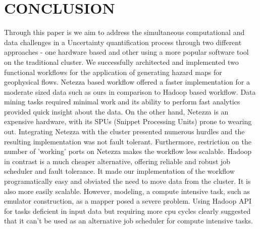 \documentclass{acm_proc_article-sp}
\begin{document}
\section{CONCLUSION}
Through this paper is we aim to address the simultaneous computational and data challenges in a Uncertainty quantification process
through two different approaches - one hardware based and other using a more popular software tool on the traditional cluster.
We successfully architected and implemented two functional workflows for the application of generating hazard maps for geophysical flows.
Netezza based workflow offered a faster implementation for a moderate sized data such as ours in comparison to Hadoop based workflow.
Data mining tasks required minimal work
and its ability to perform fast analytics provided quick insight about the data. On the other hand, Netezza is an expensive hardware, with its
SPUs (Snippet Processing Units) prone to wearing out. Integrating Netezza with the cluster presented numerous hurdles and the
resulting implementation was not fault tolerant. Furthermore, restriction on the  number of 'working' ports on Netezza makes the workflow less
scalable. Hadoop in contrast is a much cheaper alternative, offering reliable and robust job scheduler and fault tolerance. It made our
implementation of the workflow programatically easy and obviated the need to move data from the cluster. It is also more easily scalable.
However, modeling, a compute intensive
task, such as emulator construction, as a mapper posed a severe problem. Using Hadoop API for tasks deficient in input data but requiring more cpu
cycles clearly suggested that it can't be used as an alternative job scheduler for compute intensive tasks.
\end{document}
